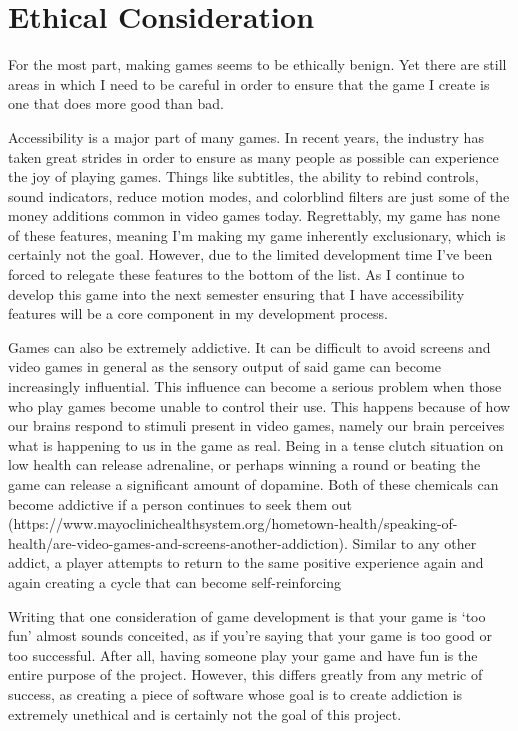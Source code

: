 \documentclass[10pt,twocolumn]{article}
\begin{document}
\section{Ethical Consideration}
For the most part, making games seems to be ethically benign. Yet there are still areas in which I need to be careful in order to ensure that the game I create is one that does more good than bad.

Accessibility is a major part of many games. In recent years, the industry has taken great strides in order to ensure as many people as possible can experience the joy of playing games. Things like subtitles, the ability to rebind controls, sound indicators, reduce motion modes, and colorblind filters are just some of the money additions common in video games today. Regrettably, my game has none of these features, meaning I’m making my game inherently exclusionary, which is certainly not the goal. However, due to the limited development time I’ve been forced to relegate these features to the bottom of the list. As I continue to develop this game into the next semester ensuring that I have accessibility features will be a core component in my development process.

Games can also be extremely addictive. It can be difficult to avoid screens and video games in general as the sensory output of said game can become increasingly influential. This influence can become a serious problem when those who play games become unable to control their use. This happens because of how our brains respond to stimuli present in video games, namely our brain perceives what is happening to us in the game as real. Being in a tense clutch situation on low health can release adrenaline, or perhaps winning a round or beating the game can release a significant amount of dopamine. Both of these chemicals can become addictive if a person continues to seek them out (https://www.mayoclinichealthsystem.org/hometown-health/speaking-of-health/are-video-games-and-screens-another-addiction). Similar to any other addict, a player attempts to return to the same positive experience again and again creating a cycle that can become self-reinforcing

Writing that one consideration of game development is that your game is ‘too fun’ almost sounds conceited, as if you’re saying that your game is too good or too successful. After all, having someone play your game and have fun is the entire purpose of the project. However, this differs greatly from any metric of success, as creating a piece of software whose goal is to create addiction is extremely unethical and is certainly not the goal of this project.
\end{document}
